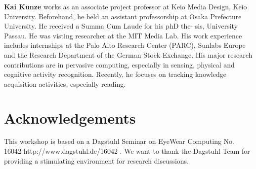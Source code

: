 \documentclass{sigchi-ext}
\begin{document}
{\bf Kai Kunze} works as an associate project professor at Keio Media Design, Keio University. Beforehand, he held an assistant professorship at Osaka Prefecture University. He received a Summa Cum Laude for his phD the- sis, University Passau. He was visting researcher at the MIT Media Lab. His work experience includes internships at the Palo Alto Research Center (PARC), Sunlabs Europe and the Research Department of the German Stock Exchange. His major research contributions are in pervasive computing, especially in sensing, physical and cognitive activity recognition. Recently, he focuses on tracking knowledge acquisition activities, especially reading.


\section{Acknowledgements}
This workshop is based on a Dagstuhl Seminar on EyeWear Computing No. 16042 http://www.dagstuhl.de/16042 . We want to thank the Dagstuhl Team for providing a stimulating environment for research discussions. 

\balance{} 



\end{document}
